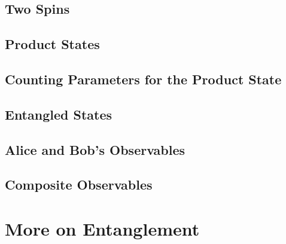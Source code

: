 \documentclass[a4paper]{article}
\begin{document}
\subsection{Two Spins}
\subsection{Product States}

\subsection{Counting Parameters for the Product State}
\subsection{Entangled States}

\subsection{Alice and Bob's Observables}


\subsection{Composite Observables}



%
%
\section{More on Entanglement}
\end{document}
